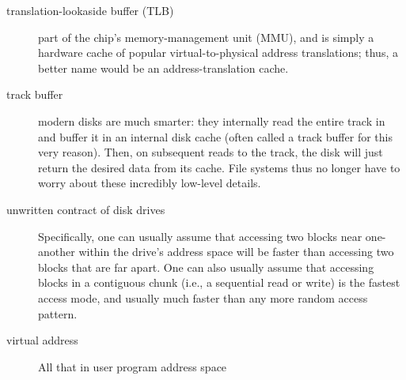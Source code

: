 \begin{description}
\item[translation-lookaside buffer (TLB)] part of the chip’s memory-management unit (MMU), and is simply a hardware cache of popular virtual-to-physical address translations; thus, a better name would be an address-translation cache.

\item[track buffer] modern disks are much smarter: they internally read the entire track in and buffer it in an internal disk cache (often called a track buffer for this very reason). Then, on subsequent reads to the track, the disk will just return the desired data from its cache. File systems thus no longer have to worry about these incredibly low-level details.


\item[unwritten contract of disk drives] Specifically, one can usually assume that accessing two blocks near one-another within the drive’s address space will be faster than accessing two blocks that are far apart. One can also usually assume that accessing blocks in a contiguous chunk (i.e., a sequential read or write) is the fastest access mode, and usually much faster than any more random access pattern.

\item[virtual address] All that in user program address space



\end{description}
